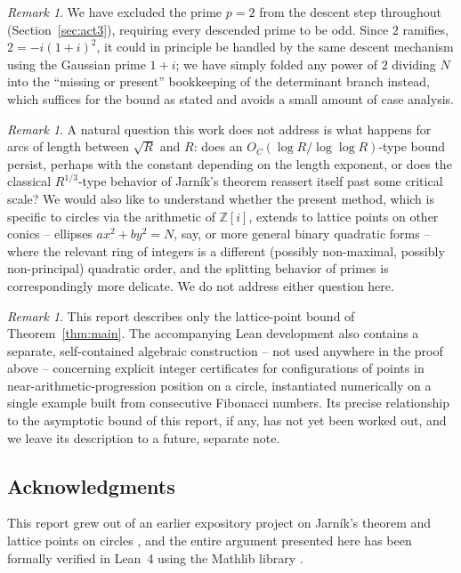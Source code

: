 \documentclass[11pt]{amsart}
\theoremstyle{definition}
\theoremstyle{remark}
\newtheorem{remark}[theorem]{Remark}
\newcommand{\Z}{\mathbb{Z}}
\begin{document}
\begin{remark}
We have excluded the prime $p=2$ from the descent step throughout (Section~\ref{sec:act3}), requiring every descended prime to be odd. Since $2$ ramifies, $2=-i(1+i)^2$, it could in principle be handled by the same descent mechanism using the Gaussian prime $1+i$; we have simply folded any power of $2$ dividing $N$ into the ``missing or present'' bookkeeping of the determinant branch instead, which suffices for the bound as stated and avoids a small amount of case analysis.
\end{remark}

\begin{remark}
A natural question this work does not address is what happens for arcs of length between $\sqrt R$ and $R$: does an $O_C(\log R/\log\log R)$-type bound persist, perhaps with the constant depending on the length exponent, or does the classical $R^{1/3}$-type behavior of Jarn\'{i}k's theorem reassert itself past some critical scale? We would also like to understand whether the present method, which is specific to circles via the arithmetic of $\Z[i]$, extends to lattice points on other conics -- ellipses $ax^2+by^2=N$, say, or more general binary quadratic forms -- where the relevant ring of integers is a different (possibly non-maximal, possibly non-principal) quadratic order, and the splitting behavior of primes is correspondingly more delicate. We do not address either question here.
\end{remark}

\begin{remark}
This report describes only the lattice-point bound of Theorem~\ref{thm:main}. The accompanying Lean development also contains a separate, self-contained algebraic construction -- not used anywhere in the proof above -- concerning explicit integer certificates for configurations of points in near-arithmetic-progression position on a circle, instantiated numerically on a single example built from consecutive Fibonacci numbers. Its precise relationship to the asymptotic bound of this report, if any, has not yet been worked out, and we leave its description to a future, separate note.
\end{remark}

\subsection*{Acknowledgments} This report grew out of an earlier expository project on Jarn\'{i}k's theorem and lattice points on circles \cite{Chen2021}, and the entire argument presented here has been formally verified in Lean~4 \cite{Lean4} using the Mathlib library \cite{Mathlib}.
\end{document}
